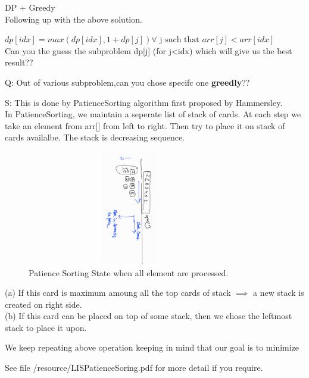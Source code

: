 \begin{solution}
    DP + Greedy\\
    Following up with the above solution.
    
    $dp[idx] = max(dp[idx] , 1+dp[j]) \forall \text{ j such that } arr[j] < arr[idx]$\\
    Can you the guess the subproblem dp[j] (for j<idx) which will give us the best result??

    \medskip
    Q: Out of various subproblem,can you chose specifc one \textbf{greedly}?? \newline

    \smallskip
    S: This is done by PatienceSorting algorithm first proposed by Hammersley.\\ In PatienceSorting, we maintain a seperate list of stack of cards.
        At each step we take an element from arr[] from left to right. Then try to place it on stack of cards availalbe.
        The stack is decreasing sequence.\\
        
        \begin{figure}[ht]
        \includegraphics[angle=90,width=9cm,height=5cm]{./resources/PatienceSoring.jpg}
        \caption{Patience Sorting State when all element are processed.}
        \end{figure}
        
        (a) If this card is maximum amoung all the top cards of stack $\implies$ a new stack is created on right side.\\
        (b) If this card can be placed on top of some stack, then we chose the leftmost stack to place it upon.
        
        We keep repeating above operation keeping in mind that our goal is to minimize 

        See file /resource/LISPatienceSoring.pdf for more detail if you require.

\end{solution}
